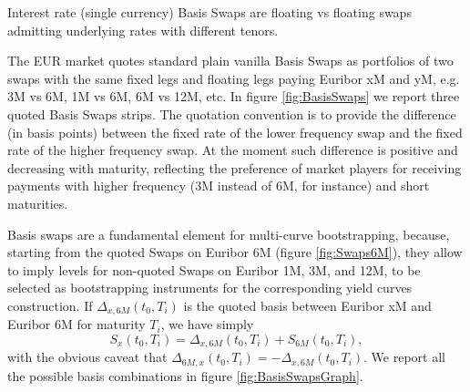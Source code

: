 \documentclass[11pt,reqno]{amsart}
\begin{document}
Interest rate (single currency) Basis Swaps are floating vs floating swaps admitting underlying rates with different tenors.
\par
The EUR market quotes standard plain vanilla Basis Swaps as portfolios of two swaps with the same fixed legs and floating legs paying Euribor xM and yM, e.g. 3M vs 6M, 1M vs 6M, 6M vs 12M, etc.
In figure \ref{fig:BasisSwaps} we report three quoted Basis Swaps strips.
The quotation convention is to provide the difference (in basis points) between the fixed rate of the lower frequency swap and the fixed rate of the higher frequency swap. At the moment such difference is positive and decreasing with maturity, reflecting the preference of market players for receiving payments with higher frequency (3M instead of 6M, for instance) and short maturities.
\par
Basis swaps are a fundamental element for multi-curve bootstrapping, because, starting from the quoted Swaps on Euribor 6M (figure \ref{fig:Swaps6M}), they allow to imply levels for non-quoted Swaps on Euribor 1M, 3M, and 12M, to be selected as bootstrapping instruments for the corresponding yield curves construction.
If $\Delta_{x,6M}\left(t_0,T_i\right)$ is the quoted basis between Euribor xM and Euribor 6M for maturity $T_i$, we have simply
\begin{equation}
S_x\left(t_0,T_i\right) = \Delta_{x,6M}\left(t_0,T_i\right) + S_{6M}\left(t_0,T_i\right),
\label{eqn:BasisSwap}
\end{equation}
with the obvious caveat that
$\Delta_{6M,x}\left(t_0,T_i\right) = - \Delta_{x,6M}\left(t_0,T_i\right)$. We report all the possible basis combinations in figure \ref{fig:BasisSwapsGraph}.
\end{document}
